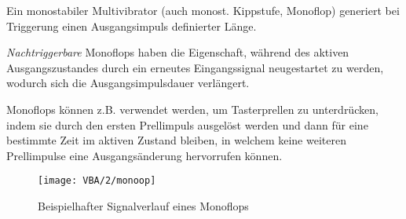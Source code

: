 Ein monostabiler Multivibrator (auch monost. Kippstufe, Monoflop) generiert bei Triggerung einen Ausgangsimpuls definierter Länge.

\emph{Nachtriggerbare} Monoflops haben die Eigenschaft, während des aktiven
Ausgangszustandes durch ein erneutes Eingangssignal neugestartet zu werden,
wodurch sich die Ausgangsimpulsdauer verlängert. 

Monoflops können z.B. verwendet werden, um Tasterprellen zu unterdrücken,
indem sie durch den ersten Prellimpuls ausgelöst werden und dann für eine
bestimmte Zeit im aktiven Zustand bleiben, in welchem keine weiteren
Prellimpulse eine Ausgangsänderung hervorrufen können.

\begin{figure}[]
  \begin{center}
    \texttt{[image: VBA/2/monoop]}
  \end{center}
  \caption{Beispielhafter Signalverlauf eines Monoflops}
\end{figure}